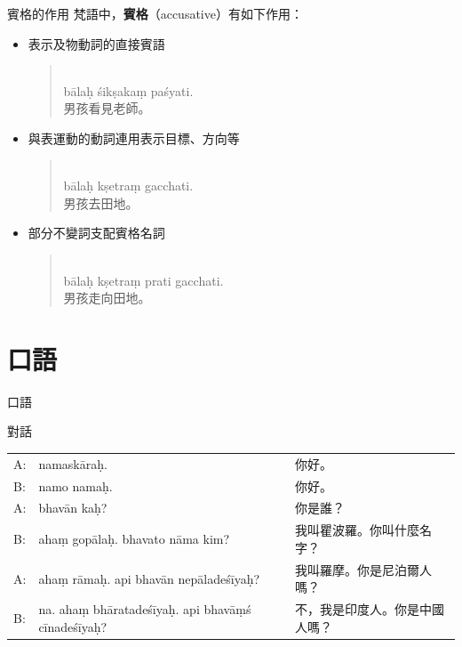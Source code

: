 \documentclass[aspectratio=169]{beamer}
\begin{document}
\begin{frame}{賓格的作用}
    梵語中，\textbf{賓格}（accusative）有如下作用：
    \begin{itemize}
        \item 表示及物動詞的直接賓語\\
        \begin{quotation}
            \\
            bālaḥ śikṣakaṃ paśyati.\\
            男孩看見老師。
        \end{quotation}
        \item 與表運動的動詞連用表示目標、方向等\\
        \begin{quotation}
            \\
            bālaḥ kṣetraṃ gacchati.\\
            男孩去田地。
        \end{quotation}
        \item 部分不變詞支配賓格名詞\\
        \begin{quotation}
            \\
            bālaḥ kṣetraṃ prati gacchati.\\
            男孩走向田地。
        \end{quotation}
    \end{itemize}
\end{frame}

\section{口語}
\begin{frame}{口語}
    \begin{block}{對話}
        \begin{tabularx}{\linewidth}{@{}LLL@{}}
            A:  & namaskāraḥ. & 你好。\\
            B:  & namo namaḥ. & 你好。\\
            A:  & bhavān kaḥ? & 你是誰？\\
            B:  & ahaṃ gopālaḥ. bhavato nāma kim? & 我叫瞿波羅。你叫什麼名字？\\
            A:  & ahaṃ rāmaḥ. api bhavān nepāladeśīyaḥ? & 我叫羅摩。你是尼泊爾人嗎？\\
            B:  & na. ahaṃ bhāratadeśīyaḥ. api bhavāṃś cīnadeśīyaḥ? & 不，我是印度人。你是中國人嗎？
        \end{tabularx}
    \end{block}
\end{frame}
\end{document}
